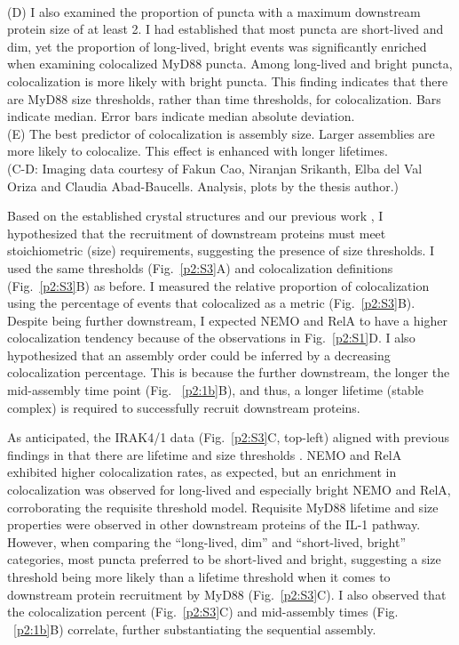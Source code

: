 \begin{centering}
{\vspace{1em}
\\
(D) I also examined the proportion of puncta with a maximum downstream protein size of at least 2\times. I had established that most puncta are short-lived and dim, yet the proportion of long-lived, bright events was significantly enriched when examining colocalized MyD88 puncta. Among long-lived and bright puncta, colocalization is more likely with bright puncta. This finding indicates that there are MyD88 size thresholds, rather than time thresholds, for colocalization. Bars indicate median. Error bars indicate median absolute deviation.
\vspace{1em}
\\
(E) The best predictor of colocalization is assembly size. Larger assemblies are more likely to colocalize. This effect is enhanced with longer lifetimes.
\vspace{1em}
\\
(C-D: Imaging data courtesy of Fakun Cao, Niranjan Srikanth, Elba del Val Oriza and Claudia Abad-Baucells. Analysis, plots by the thesis author.)}
\label{p2:S2}
\end{centering}

Based on the established crystal structures \autocite{Lin_2010}\autocite{Ye_2002} and our previous work \autocite{Cao_2023}\autocite{Deliz-Aguirre_2021}, I hypothesized that the recruitment of downstream proteins must meet stoichiometric (size) requirements, suggesting the presence of size thresholds. I used the same thresholds (Fig.~\ref{p2:S3}A) and colocalization definitions (Fig.~\ref{p2:S3}B) as before. I measured the relative proportion of colocalization using the percentage of events that colocalized as a metric (Fig.~\ref{p2:S3}B). Despite being further downstream, I expected NEMO and RelA to have a higher colocalization tendency because of the observations in Fig.~\ref{p2:S1}D. I also hypothesized that an assembly order could be inferred by a decreasing colocalization percentage. This is because the further downstream, the longer the mid-assembly time point (Fig. ~\ref{p2:1b}B), and thus, a longer lifetime (stable complex) is required to successfully recruit downstream proteins.

As anticipated, the IRAK4/1 data (Fig.~\ref{p2:S3}C, top-left) aligned with previous findings in that there are lifetime and size thresholds \autocite{Deliz-Aguirre_2021}. NEMO and RelA exhibited higher colocalization rates, as expected, but an enrichment in colocalization was observed for long-lived and especially bright NEMO and RelA, corroborating the requisite threshold model. Requisite MyD88 lifetime and size properties were observed in other downstream proteins of the IL-1 pathway. However, when comparing the “long-lived, dim” and “short-lived, bright” categories, most puncta preferred to be short-lived and bright, suggesting a size threshold being more likely than a lifetime threshold when it comes to downstream protein recruitment by MyD88 (Fig.~\ref{p2:S3}C). I also observed that the colocalization percent (Fig.~\ref{p2:S3}C) and mid-assembly times (Fig. ~\ref{p2:1b}B) correlate, further substantiating the sequential assembly.

